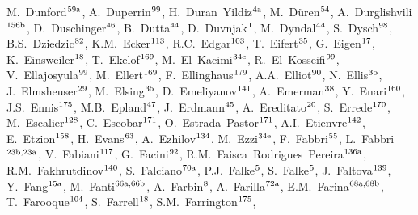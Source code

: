 \begin{flushleft}
M.~Dunford$^\textrm{\scriptsize 59a}$,    
A.~Duperrin$^\textrm{\scriptsize 99}$,    
H.~Duran~Yildiz$^\textrm{\scriptsize 4a}$,    
M.~D\"uren$^\textrm{\scriptsize 54}$,    
A.~Durglishvili$^\textrm{\scriptsize 156b}$,    
D.~Duschinger$^\textrm{\scriptsize 46}$,    
B.~Dutta$^\textrm{\scriptsize 44}$,    
D.~Duvnjak$^\textrm{\scriptsize 1}$,    
M.~Dyndal$^\textrm{\scriptsize 44}$,    
S.~Dysch$^\textrm{\scriptsize 98}$,    
B.S.~Dziedzic$^\textrm{\scriptsize 82}$,    
K.M.~Ecker$^\textrm{\scriptsize 113}$,    
R.C.~Edgar$^\textrm{\scriptsize 103}$,    
T.~Eifert$^\textrm{\scriptsize 35}$,    
G.~Eigen$^\textrm{\scriptsize 17}$,    
K.~Einsweiler$^\textrm{\scriptsize 18}$,    
T.~Ekelof$^\textrm{\scriptsize 169}$,    
M.~El~Kacimi$^\textrm{\scriptsize 34c}$,    
R.~El~Kosseifi$^\textrm{\scriptsize 99}$,    
V.~Ellajosyula$^\textrm{\scriptsize 99}$,    
M.~Ellert$^\textrm{\scriptsize 169}$,    
F.~Ellinghaus$^\textrm{\scriptsize 179}$,    
A.A.~Elliot$^\textrm{\scriptsize 90}$,    
N.~Ellis$^\textrm{\scriptsize 35}$,    
J.~Elmsheuser$^\textrm{\scriptsize 29}$,    
M.~Elsing$^\textrm{\scriptsize 35}$,    
D.~Emeliyanov$^\textrm{\scriptsize 141}$,    
A.~Emerman$^\textrm{\scriptsize 38}$,    
Y.~Enari$^\textrm{\scriptsize 160}$,    
J.S.~Ennis$^\textrm{\scriptsize 175}$,    
M.B.~Epland$^\textrm{\scriptsize 47}$,    
J.~Erdmann$^\textrm{\scriptsize 45}$,    
A.~Ereditato$^\textrm{\scriptsize 20}$,    
S.~Errede$^\textrm{\scriptsize 170}$,    
M.~Escalier$^\textrm{\scriptsize 128}$,    
C.~Escobar$^\textrm{\scriptsize 171}$,    
O.~Estrada~Pastor$^\textrm{\scriptsize 171}$,    
A.I.~Etienvre$^\textrm{\scriptsize 142}$,    
E.~Etzion$^\textrm{\scriptsize 158}$,    
H.~Evans$^\textrm{\scriptsize 63}$,    
A.~Ezhilov$^\textrm{\scriptsize 134}$,    
M.~Ezzi$^\textrm{\scriptsize 34e}$,    
F.~Fabbri$^\textrm{\scriptsize 55}$,    
L.~Fabbri$^\textrm{\scriptsize 23b,23a}$,    
V.~Fabiani$^\textrm{\scriptsize 117}$,    
G.~Facini$^\textrm{\scriptsize 92}$,    
R.M.~Faisca~Rodrigues~Pereira$^\textrm{\scriptsize 136a}$,    
R.M.~Fakhrutdinov$^\textrm{\scriptsize 140}$,    
S.~Falciano$^\textrm{\scriptsize 70a}$,    
P.J.~Falke$^\textrm{\scriptsize 5}$,    
S.~Falke$^\textrm{\scriptsize 5}$,    
J.~Faltova$^\textrm{\scriptsize 139}$,    
Y.~Fang$^\textrm{\scriptsize 15a}$,    
M.~Fanti$^\textrm{\scriptsize 66a,66b}$,    
A.~Farbin$^\textrm{\scriptsize 8}$,    
A.~Farilla$^\textrm{\scriptsize 72a}$,    
E.M.~Farina$^\textrm{\scriptsize 68a,68b}$,    
T.~Farooque$^\textrm{\scriptsize 104}$,    
S.~Farrell$^\textrm{\scriptsize 18}$,    
S.M.~Farrington$^\textrm{\scriptsize 175}$,    

\end{flushleft}
